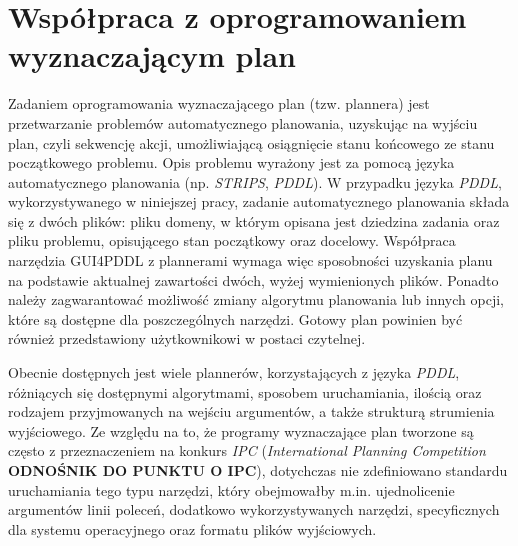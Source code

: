 \section{Współpraca z oprogramowaniem wyznaczającym plan}
\label{sec:wspolpraca}
Zadaniem oprogramowania wyznaczającego plan (tzw. plannera) jest przetwarzanie problemów automatycznego planowania, uzyskując na wyjściu plan, czyli sekwencję akcji, umożliwiającą osiągnięcie stanu końcowego ze stanu początkowego problemu. Opis problemu wyrażony jest za pomocą języka automatycznego planowania (np. \textit{STRIPS}, \textit{PDDL}). W przypadku języka \textit{PDDL}, wykorzystywanego w niniejszej pracy, zadanie automatycznego planowania składa się z dwóch plików: pliku domeny, w którym opisana jest dziedzina zadania oraz pliku problemu, opisującego stan początkowy oraz docelowy. Współpraca narzędzia GUI4PDDL z plannerami wymaga więc sposobności uzyskania planu na podstawie aktualnej zawartości dwóch, wyżej wymienionych plików. Ponadto należy zagwarantować możliwość zmiany algorytmu planowania lub innych opcji, które są dostępne dla poszczególnych narzędzi. Gotowy plan powinien być również przedstawiony użytkownikowi w postaci czytelnej.

Obecnie dostępnych jest wiele plannerów, korzystających z języka \textit{PDDL}, różniących się dostępnymi algorytmami, sposobem uruchamiania, ilością oraz rodzajem przyjmowanych na wejściu argumentów, a także strukturą strumienia wyjściowego. Ze względu na to, że programy wyznaczające plan tworzone są często z przeznaczeniem na konkurs \textit{IPC} (\textit{International Planning Competition} \textbf{ODNOŚNIK DO PUNKTU O IPC}), dotychczas nie zdefiniowano standardu uruchamiania tego typu narzędzi, który obejmowałby m.in. ujednolicenie argumentów linii poleceń, dodatkowo wykorzystywanych narzędzi, specyficznych dla systemu operacyjnego oraz formatu plików wyjściowych.

